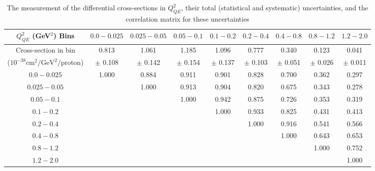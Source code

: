 \newcommand{\qsq}{\ensuremath{Q^2_{QE}}\xspace}
\renewcommand{\textfraction}{0.05}
\renewcommand{\topfraction}{0.95}
\renewcommand{\bottomfraction}{0.95}
\renewcommand{\floatpagefraction}{0.95}
\renewcommand{\dblfloatpagefraction}{0.95}
\renewcommand{\dbltopfraction}{0.95}
\setcounter{totalnumber}{5}
\setcounter{bottomnumber}{3}
\setcounter{topnumber}{3}
\setcounter{dbltopnumber}{3}


\begingroup
\squeezetable
\begin{table}[!h]
{\normalsize {}\hfill\vspace*{4ex}}
\tabcolsep=0.11cm
\begin{tabular}{c|cccccccc}
\hline
$\qsq$ (GeV$^2$) Bins & $0.0 - 0.025$ & $0.025 - 0.05$ & $0.05 - 0.1$ & $0.1 - 0.2$ & $0.2 - 0.4$ & $0.4 - 0.8$ & $0.8 - 1.2$ & $1.2 - 2.0$ \\ 
\hline
Cross-section in bin  
 & 0.813 & 1.061 & 1.185 & 1.096 & 0.777 & 0.340 & 0.123 & 0.041 \\ 
($10^{-38}\mathrm{cm}^2/\mathrm{GeV}^2/$proton)  & $\pm$ 0.108 & $\pm$ 0.142 & $\pm$ 0.154 & $\pm$ 0.137 & $\pm$ 0.103 & $\pm$ 0.051 & $\pm$ 0.026 & $\pm$ 0.011\\
\hline
$0.0 - 0.025$  & 1.000 & 0.884 & 0.911 & 0.901 & 0.828 & 0.700 & 0.362 & 0.297 \\ 
$0.025 - 0.05$  &  & 1.000 & 0.913 & 0.904 & 0.820 & 0.675 & 0.343 & 0.278 \\ 
$0.05 - 0.1$  &  &  & 1.000 & 0.942 & 0.875 & 0.726 & 0.353 & 0.319 \\ 
$0.1 - 0.2$  &  &  &  & 1.000 & 0.933 & 0.825 & 0.431 & 0.413 \\ 
$0.2 - 0.4$  &  &  &  &  & 1.000 & 0.916 & 0.541 & 0.566 \\ 
$0.4 - 0.8$  &  &  &  &  &  & 1.000 & 0.643 & 0.653 \\ 
$0.8 - 1.2$  &  &  &  &  &  &  & 1.000 & 0.752 \\ 
$1.2 - 2.0$  &  &  &  &  &  &  &  & 1.000 \\ 
\hline
\end{tabular}
\caption{The measurement of the differential cross-sections in $Q^2_{QE}$,
their total (statistical and systematic) uncertainties, and the correlation matrix for these uncertainties}
\end{table}
\endgroup

